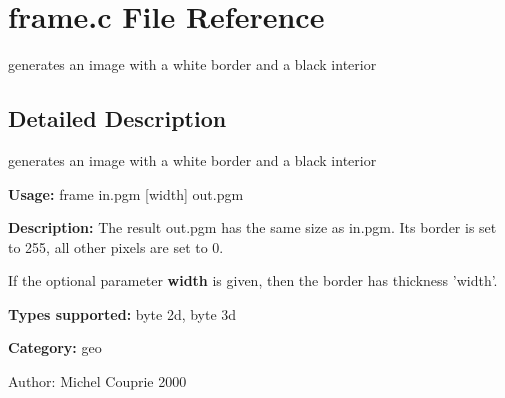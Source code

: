 \section{frame.c File Reference}
\label{frame_8c}
generates an image with a white border and a black interior 



\subsection{Detailed Description}
generates an image with a white border and a black interior 

{\bf Usage:} frame in.pgm [width] out.pgm

{\bf Description:} The result out.pgm has the same size as in.pgm. Its border is set to 255, all other pixels are set to 0.

If the optional parameter {\bf width} is given, then the border has thickness 'width'.

{\bf Types supported:} byte 2d, byte 3d

{\bf Category:} geo

\begin{Desc}
\item[Author:]Michel Couprie 2000 \end{Desc}
